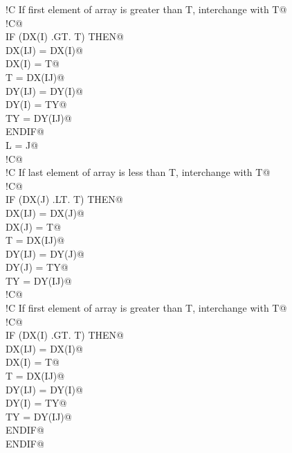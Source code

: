 \documentclass[10pt,a4paper,notitlepage]{article}
\begin{document}
\begin{flushleft}
\begin{list}{}{}
\mbox{}\verb@!C     If first element of array is greater than T, interchange with T@\\
\mbox{}\verb@!C@\\
\mbox{}\verb@      IF (DX(I) .GT. T) THEN@\\
\mbox{}\verb@         DX(IJ) = DX(I)@\\
\mbox{}\verb@         DX(I) = T@\\
\mbox{}\verb@         T = DX(IJ)@\\
\mbox{}\verb@         DY(IJ) = DY(I)@\\
\mbox{}\verb@         DY(I) = TY@\\
\mbox{}\verb@         TY = DY(IJ)@\\
\mbox{}\verb@      ENDIF@\\
\mbox{}\verb@      L = J@\\
\mbox{}\verb@!C@\\
\mbox{}\verb@!C     If last element of array is less than T, interchange with T@\\
\mbox{}\verb@!C@\\
\mbox{}\verb@      IF (DX(J) .LT. T) THEN@\\
\mbox{}\verb@         DX(IJ) = DX(J)@\\
\mbox{}\verb@         DX(J) = T@\\
\mbox{}\verb@         T = DX(IJ)@\\
\mbox{}\verb@         DY(IJ) = DY(J)@\\
\mbox{}\verb@         DY(J) = TY@\\
\mbox{}\verb@         TY = DY(IJ)@\\
\mbox{}\verb@!C@\\
\mbox{}\verb@!C        If first element of array is greater than T, interchange with T@\\
\mbox{}\verb@!C@\\
\mbox{}\verb@         IF (DX(I) .GT. T) THEN@\\
\mbox{}\verb@            DX(IJ) = DX(I)@\\
\mbox{}\verb@            DX(I) = T@\\
\mbox{}\verb@            T = DX(IJ)@\\
\mbox{}\verb@            DY(IJ) = DY(I)@\\
\mbox{}\verb@            DY(I) = TY@\\
\mbox{}\verb@            TY = DY(IJ)@\\
\mbox{}\verb@         ENDIF@\\
\mbox{}\verb@      ENDIF@\\

\end{list}
\end{flushleft}
\end{document}
